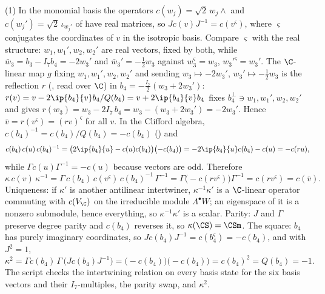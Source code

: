 (1) In the monomial basis the operators $c(w_j) = \sqrt2\,w_j\wedge$ and $c(w_j') = \sqrt2\,\iota_{w_j'}$ of  have real matrices, so $J c(v) J^{-1} = c(v^\varsigma)$, where $\varsigma$ conjugates the coordinates of $v$ in the isotropic basis. Compare $\varsigma$ with the real structure: $w_1, w_1', w_2, w_2'$ are real vectors, fixed by both, while $\bar w_3 = b_3 - I_7b_4 = -2w_3'$ and $\bar w_3' = -\tfrac12 w_3$ against $w_3^\varsigma = w_3$, $w_3'^\varsigma = w_3'$. The $\C$-linear map $g$ fixing $w_1, w_1', w_2, w_2'$ and sending $w_3 \mapsto -2w_3'$, $w_3' \mapsto -\tfrac12 w_3$ is the reflection $r$ (, read over $\C$) in $b_4 = -\tfrac{I_7}{2}(w_3 + 2w_3')$: $r(v) = v - 2\ip{b_4}{v}b_4/Q(b_4) = v + 2\ip{b_4}{v}b_4$ fixes $b_4^\perp \ni w_1, w_1', w_2, w_2'$ and gives $r(w_3) = w_3 - 2I_7\,b_4 = w_3 - (w_3 + 2w_3') = -2w_3'$. Hence $\bar v = r(v^\varsigma) = (rv)^\varsigma$ for all $v$. In the Clifford algebra, $c(b_4)^{-1} = c(b_4)/Q(b_4) = -c(b_4)$ () and
\[
c(b_4)\,c(u)\,c(b_4)^{-1} = \bigl(2\ip{b_4}{u} - c(u)c(b_4)\bigr)\bigl(-c(b_4)\bigr) = -2\ip{b_4}{u}c(b_4) - c(u) = -c(ru),
\]
while $\Gamma c(u)\Gamma^{-1} = -c(u)$ because vectors are odd. Therefore
\[
\kappa\,c(v)\,\kappa^{-1} = \Gamma\,c(b_4)\,c(v^\varsigma)\,c(b_4)^{-1}\,\Gamma^{-1} = \Gamma\bigl(-c(r v^\varsigma)\bigr)\Gamma^{-1} = c(r v^\varsigma) = c(\bar v).
\]
Uniqueness: if $\kappa'$ is another antilinear intertwiner, $\kappa^{-1}\kappa'$ is a $\C$-linear operator commuting with $c(V_\C)$ on the irreducible module $\Lambda^\bullet W$; an eigenspace of it is a nonzero submodule, hence everything, so $\kappa^{-1}\kappa'$ is a scalar. Parity: $J$ and $\Gamma$ preserve degree parity and $c(b_4)$ reverses it, so $\kappa(\CS) = \CSm$. The square: $b_4$ has purely imaginary coordinates, so $J c(b_4) J^{-1} = c(b_4^\varsigma) = -c(b_4)$, and with $J^2 = 1$,
\[
\kappa^2 = \Gamma c(b_4)\,\Gamma\,\bigl(J c(b_4) J^{-1}\bigr) = \bigl(-c(b_4)\bigr)\bigl(-c(b_4)\bigr) = c(b_4)^2 = Q(b_4) = -1 .
\]
The script checks the intertwining relation on every basis state for the six basis vectors and their $I_7$-multiples, the parity swap, and $\kappa^2$.


